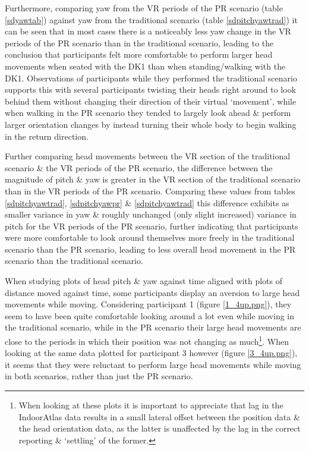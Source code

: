 Furthermore, comparing yaw from the VR periods of the PR scenario (table \ref{sdyawtab}) against yaw from the traditional scenario (table \ref{sdpitchyawtrad}) it can be seen that in most cases there is a noticeably less yaw change in the VR periods of the PR scenario than in the traditional scenario, leading to the conclusion that participants felt more comfortable to perform larger head movements when seated with the DK1 than when standing/walking with the DK1. Observations of participants while they performed the traditional scenario supports this with several participants twisting their heads right around to look behind them without changing their direction of their virtual `movement', while when walking in the PR scenario they tended to largely look ahead \& perform larger orientation changes by instead turning their whole body to begin walking in the return direction.

Further comparing head movements between the VR section of the traditional scenario \& the VR periods of the PR scenario, the difference between the magnitude of pitch \& yaw is greater in the VR section of the traditional scenario than in the VR periods of the PR scenario. Comparing these values from tables \ref{sdpitchyawtrad}, \ref{sdpitchyawpr} \& \ref{sdpitchyawtrad} this difference exhibits as smaller variance in yaw \& roughly unchanged (only slight increased) variance in pitch for the VR periods of the PR scenario, further indicating that participants were more comfortable to look around themselves more freely in the traditional scenario than the PR scenario, leading to less overall head movement in the PR scenario than the traditional scenario.


When studying plots of head pitch \& yaw against time aligned with plots of distance moved against time, some participants display an aversion to large head movements while moving. Considering participant 1 (figure \ref{1_4up.png}), they seem to have been quite comfortable looking around a lot even while moving in the traditional scenario, while in the PR scenario their large head movements are close to the periods in which their position was not changing as much\footnote{When looking at these plots it is important to appreciate that lag in the IndoorAtlas data results in a small lateral offset between the position data \& the head orientation data, as the latter is unaffected by the lag in the correct reporting \& `settling' of the former.}. When looking at the same data plotted for participant 3 however (figure \ref{3_4up.png}), it seems that they were reluctant to perform large head movements while moving in both scenarios, rather than just the PR scenario.


